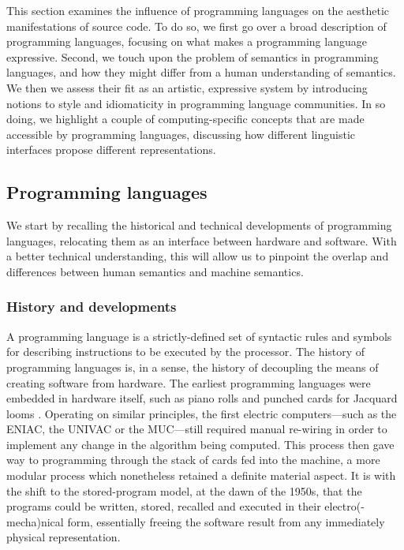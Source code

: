 This section examines the influence of programming languages on the aesthetic manifestations of source code. To do so, we first go over a broad description of programming languages, focusing on what makes a programming language expressive. Second, we touch upon the problem of semantics in programming languages, and how they might differ from a human understanding of semantics. We then we assess their fit as an artistic, expressive system by introducing notions to style and idiomaticity in programming language communities. In so doing, we highlight a couple of computing-specific concepts that are made accessible by programming languages, discussing how different linguistic interfaces propose different representations.

\subsection{Programming languages}
\label{subsec:programming-languages}

We start by recalling the historical and technical developments of programming languages, relocating them as an interface between hardware and software. With a better technical understanding, this will allow us to pinpoint the overlap and differences between human semantics and machine semantics.

\subsubsection{History and developments}
\label{subsubsec:history-developments}

A programming language is a strictly-defined set of syntactic rules and symbols for describing instructions to be executed by the processor. The history of programming languages is, in a sense, the history of decoupling the means of creating software from hardware. The earliest programming languages were embedded in hardware itself, such as piano rolls and punched cards for Jacquard looms \citep{sack_software_2019}. Operating on similar principles, the first electric computers—such as the ENIAC, the UNIVAC or the MUC—still required manual re-wiring in order to implement any change in the algorithm being computed. This process then gave way to programming through the stack of cards fed into the machine, a more modular process which nonetheless retained a definite material aspect. It is with the shift to the stored-program model, at the dawn of the 1950s, that the programs could be written, stored, recalled and executed in their electro(-mecha)nical form, essentially freeing the software result from any immediately physical representation.

